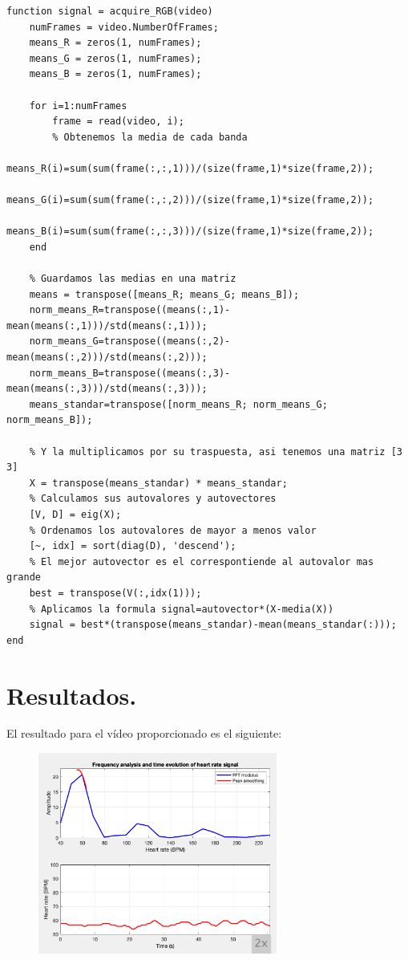 \documentclass[11pt]{article}
\begin{document}
\begin{lstlisting}
function signal = acquire_RGB(video)
	numFrames = video.NumberOfFrames;
	means_R = zeros(1, numFrames);
	means_G = zeros(1, numFrames);
	means_B = zeros(1, numFrames);
	
	for i=1:numFrames
		frame = read(video, i);
		% Obtenemos la media de cada banda
		means_R(i)=sum(sum(frame(:,:,1)))/(size(frame,1)*size(frame,2));
		means_G(i)=sum(sum(frame(:,:,2)))/(size(frame,1)*size(frame,2));
		means_B(i)=sum(sum(frame(:,:,3)))/(size(frame,1)*size(frame,2));
	end
	
	% Guardamos las medias en una matriz
	means = transpose([means_R; means_G; means_B]);
	norm_means_R=transpose((means(:,1)-mean(means(:,1)))/std(means(:,1)));
	norm_means_G=transpose((means(:,2)-mean(means(:,2)))/std(means(:,2)));
	norm_means_B=transpose((means(:,3)-mean(means(:,3)))/std(means(:,3)));
	means_standar=transpose([norm_means_R; norm_means_G; norm_means_B]);
	
	% Y la multiplicamos por su traspuesta, asi tenemos una matriz [3 3]
	X = transpose(means_standar) * means_standar;
	% Calculamos sus autovalores y autovectores
	[V, D] = eig(X);
	% Ordenamos los autovalores de mayor a menos valor
	[~, idx] = sort(diag(D), 'descend');
	% El mejor autovector es el correspontiende al autovalor mas grande
	best = transpose(V(:,idx(1)));
	% Aplicamos la formula signal=autovector*(X-media(X))
	signal = best*(transpose(means_standar)-mean(means_standar(:)));
end
\end{lstlisting}

\section{Resultados.}

El resultado para el vídeo proporcionado es el siguiente:

\begin{figure}[H]
	\centering
	\includegraphics[width=0.7\textwidth]{images/originalRGB.png}
\end{figure}
\end{document}
